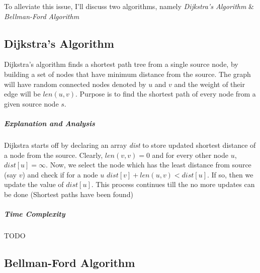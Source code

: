 \documentclass[11pt,a4paper]{extarticle}
\begin{document}
To alleviate this issue, I'll discuss two algorithms, namely \textit{Dijkstra's Algorithm} \& \textit{Bellman-Ford Algorithm}

\subsection{Dijkstra's Algorithm}
Dijkstra’s algorithm finds a shortest path tree from a single source node, by building a set of nodes that have minimum distance from the source. The graph will have random connected nodes denoted by $u$ and $v$ and the weight of their edge will be $len(u,v)$. Purpose is to find the shortest path of every node from a given source node $s$.

\begin{adjustwidth}{2.5em}{0pt}

\end{adjustwidth}

\subparagraph{Explanation and Analysis}
Dijkstra starts off by declaring an array \textit{dist} to store updated shortest distance of a node from the source. Clearly, $len(v,v) = 0$ and for every other node $u$, $dist[u] = \infty$. Now, we select the node which has the least distance from source (say $v$) and check if for a node $u$ $dist[v] + len(u,v) < dist[u]$. If so, then we update the value of $dist[u]$. This process continues till the no more updates can be done (Shortest paths have been found)

\subparagraph{Time Complexity}
TODO

\subsection{Bellman-Ford Algorithm}
\end{document}
